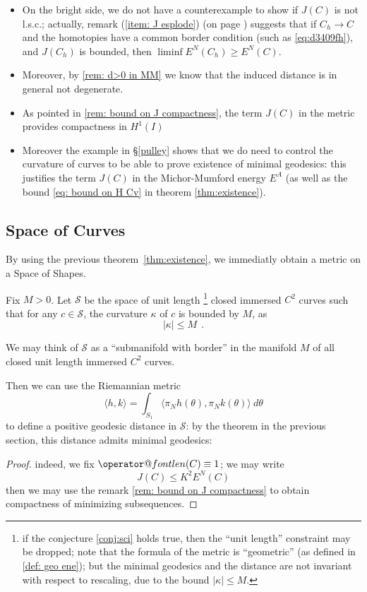 \documentclass[twoside,a4paper,english]{article}
\makeatletter
\def\len{\mathop{\operator@font len}\nolimits}
\makeatother
\begin{document}
\begin{itemize}
\item On the bright side, we do not have a counterexample
  to show if $J(C)$ is not l.s.c.; actually,
  remark (\ref{item: J esplode}) (on page \pageref{item: J esplode})
  suggests that if  $C_h\to C$ and the homotopies have a common border 
  condition (such as \eqref{eq:d3409fh}),
  and $J(C_h)$ is  bounded, then $\liminf E^N(C_h)\ge  E^N(C)$.

\item 
  Moreover, by \ref{rem: d>0 in MM} we know that 
  the induced distance is in general not degenerate.

\item As pointed in \ref{rem: bound on J compactness},
  the term $J(C)$ in the metric provides compactness in $H^1(I)$

\item Moreover the  example in \S\ref{pulley} shows 
  that we do need to control the curvature of curves to be able
  to prove existence of minimal geodesics: this justifies the term $J(C)$
  in the Michor-Mumford energy $E^A$ (as
  well as the bound \eqref{eq: bound on H Cv} in theorem \ref{thm:existence}).
\end{itemize}

     

\subsection{Space of Curves}
\label{sec: space of bounded curvature}
By using the previous theorem~\ref{thm:existence}, we immediatly obtain 
a metric on a Space of Shapes.


Fix $M>0$.
Let $\mathcal S$ be the space of unit length
\footnote{if the conjecture \ref{conj:sci} holds true, then
 the ``unit length'' constraint may be dropped; 
 note that the formula of the metric is ``geometric'' (as defined in 
 \ref{def: geo ene}); but the minimal geodesics and the
 distance are not invariant
 with respect to rescaling, due to the bound $|\kappa| \le M$.
} closed immersed $C^2$ curves such
that for any $c\in \mathcal S$, the curvature $\kappa$ of $c$ is
bounded by $M$, as 
\[ |\kappa| \le M ~~.\]

We may think of  $\mathcal S$ as a ``submanifold with border'' in the
manifold $M$ of all closed unit length immersed $C^2$ curves.

Then we can use 
the Riemannian metric
\[ \langle h,k\rangle =
\int_{S_1} \langle \pi_Nh(\theta),\pi_N k(\theta)\rangle ~d\theta \]
to define a positive geodesic distance  in $\mathcal S$:
by the theorem in the previous section, this distance admits minimal
geodesics:
\begin{proof}
  indeed, we fix $\len(C)\equiv 1$;  we may write 
  \[ J(C) \le K^2 E^N(C) \]
  then we may use the remark  \ref{rem: bound on J compactness}
  to obtain compactness of minimizing subsequences.
\end{proof}
\end{document}
